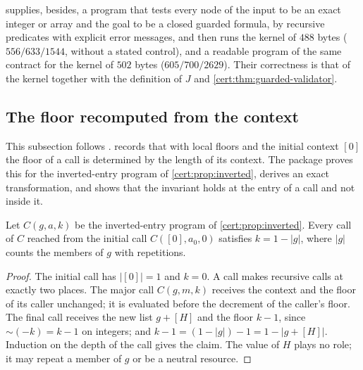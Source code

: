  supplies, besides, a program that tests every node of
the input to be an exact integer or array and the goal to be a closed guarded
formula, by recursive predicates with explicit error messages, and then runs
the kernel of $488$ bytes ($556/633/1544$, without a stated control), and
 a readable program of the same contract for the
kernel of $502$ bytes ($605/700/2629$). Their correctness is that of the
kernel together with the definition of $J$ and
\cref{cert:thm:guarded-validator}.

\subsection{The floor recomputed from the context}\label{cert:sec:context-floor}

This subsection follows .
 records that with local floors and the initial
context $[0]$ the floor of a call is determined by the length of its context.
The package proves this for the inverted-entry program of
\cref{cert:prop:inverted}, derives an exact transformation, and shows that
the invariant holds at the entry of a call and not inside it.

\begin{lemma}\label{cert:lem:context-floor}
Let $C(g,a,k)$ be the inverted-entry program of \cref{cert:prop:inverted}.
Every call of $C$ reached from the initial call $C([0],a_0,0)$ satisfies
$k=1-\lvert g\rvert$, where $\lvert g\rvert$ counts the members of $g$ with
repetitions.
\end{lemma}
\begin{proof}
The initial call has $\lvert[0]\rvert=1$ and $k=0$. A call makes recursive
calls at exactly two places. The major call $C(g,m,k)$ receives the context
and the floor of its caller unchanged; it is evaluated before the decrement
of the caller's floor. The final call receives the new list $g+[H]$ and the
floor $k-1$, since $\mathord{\sim}(-k)=k-1$ on integers; and
$k-1=(1-\lvert g\rvert)-1=1-\lvert g+[H]\rvert$. Induction on the depth of
the call gives the claim. The value of $H$ plays no role; it may repeat a
member of $g$ or be a neutral resource.
\end{proof}

